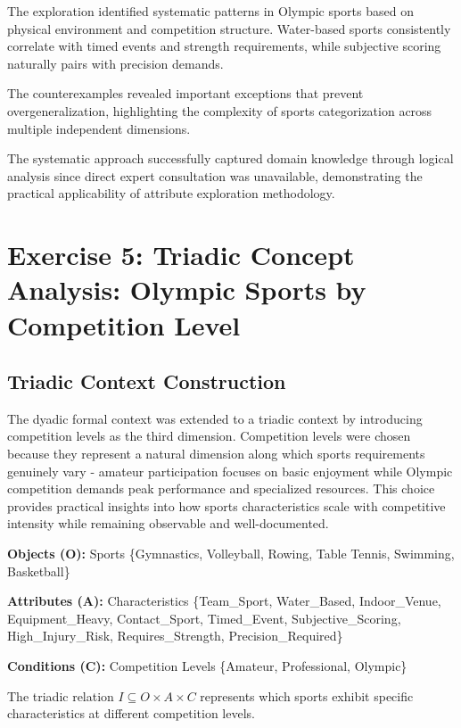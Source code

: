 \documentclass{article}
\begin{document}
The exploration identified systematic patterns in Olympic sports based on physical environment and competition structure. Water-based sports consistently correlate with timed events and strength requirements, while subjective scoring naturally pairs with precision demands.

The counterexamples revealed important exceptions that prevent overgeneralization, highlighting the complexity of sports categorization across multiple independent dimensions.

The systematic approach successfully captured domain knowledge through logical analysis since direct expert consultation was unavailable, demonstrating the practical applicability of attribute exploration methodology.

\newpage
\section*{Exercise 5: Triadic Concept Analysis: Olympic Sports by Competition Level}

\subsection*{Triadic Context Construction}

The dyadic formal context was extended to a triadic context by introducing competition levels as the third dimension. Competition levels were chosen because they represent a natural dimension along which sports requirements genuinely vary - amateur participation focuses on basic enjoyment while Olympic competition demands peak performance and specialized resources. This choice provides practical insights into how sports characteristics scale with competitive intensity while remaining observable and well-documented.

\textbf{Objects (O):} Sports \{Gymnastics, Volleyball, Rowing, Table Tennis, Swimming, Basketball\}

\textbf{Attributes (A):} Characteristics \{Team\_Sport, Water\_Based, Indoor\_Venue, Equipment\_Heavy, Contact\_Sport, Timed\_Event, Subjective\_Scoring, High\_Injury\_Risk, Requires\_Strength, Precision\_Required\}

\textbf{Conditions (C):} Competition Levels \{Amateur, Professional, Olympic\}

The triadic relation $I \subseteq O \times A \times C$ represents which sports exhibit specific characteristics at different competition levels.
\end{document}
